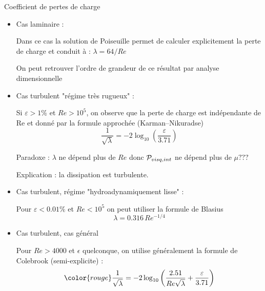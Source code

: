 \begin{frame}{Coefficient de pertes de charge}

             

\small

\begin{itemize}

\item Cas laminaire :

Dans ce cas la solution de Poiseuille permet de calculer explicitement la perte de charge et conduit à : $\lambda = 64/Re$ 
{\color{gray}{[Exercice MMC ]}}

On peut retrouver l'ordre de grandeur de ce résultat par analyse dimensionnelle 
{\color{gray}{[Démo]}}

\medskip \pause

\item Cas turbulent "régime très rugueux" :

Si  $\varepsilon > 1\%$ et $Re>10^5$, on observe que la perte de charge est indépendante de Re et donné par la formule approchée (Karman--Nikuradse)
\begin{equation}
   \frac{1}{\sqrt{\lambda}} = -2 \log_{10} \left( \frac{\varepsilon}{3.71} \right)
\end{equation}
\pause 

Paradoxe : $\lambda$ ne dépend plus de $Re$ donc ${\cal P}_{visq,int}$ ne dépend plus de $\mu ???$

Explication : la dissipation est turbulente.

\medskip \pause

\item Cas turbulent, régime "hydroadynamiquement lisse" :

Pour $\varepsilon < 0.01\%$ et $Re<10^5$ on peut utiliser  la formule de Blasius
\begin{equation}
   \lambda= 0.316 \, Re^{-1/4}
   \end{equation}

\medskip \pause

\item Cas turbulent, cas général

Pour $Re >4000$ et $\epsilon$ quelconque, on utilise généralement la formule de 
\textcolor{vert}{Colebrook} (semi-explicite) :
\begin{equation}
	\color{rouge}
  \frac{1}{\sqrt{\lambda}} = -2 \log_{10} \left (
  \frac{2.51}{Re\sqrt{\lambda}} + \frac{\varepsilon}{3.71}
  \right)
\end{equation}


\end{itemize}
\end{frame}
